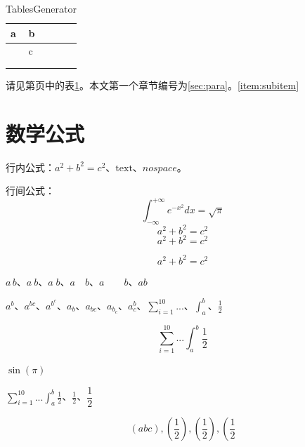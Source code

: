 \documentclass{article}
\begin{document}
\begin{table}
\caption{TablesGenerator}\label{tab:table}
\begin{tabular}{|lllll}
\hline
\multicolumn{1}{|l|}{a} & \multicolumn{1}{l|}{b} & \multicolumn{1}{l|}{} & \multicolumn{1}{l|}{} & \multicolumn{1}{l|}{} \\ \hline
\multicolumn{1}{|l|}{}  & \multicolumn{2}{l|}{c}                         & \multicolumn{1}{l|}{} & \multicolumn{1}{l|}{} \\ \hline
\multicolumn{1}{|l|}{}  & \multicolumn{1}{l|}{}  &                       &                       &                       \\ \hline
                        & \multicolumn{1}{l|}{}  & \multicolumn{1}{l|}{} & \multicolumn{1}{l|}{} & \multicolumn{1}{l|}{} \\ \hline
\end{tabular}
\end{table}

请见第\pageref{tab:table}页中的表\ref{tab:table}。本文第一个章节编号为\ref{sec:para}。\ref{item:subitem}

\appendix

\newpage

\section{数学公式}

行内公式：$a^2+b^2=c^2$、$\text{text}$、$no space$。

行间公式：
\begin{equation}
    \int_{-\infty}^{+\infty} e^{-x^2} dx = \sqrt{\pi}
\end{equation}
$$
a^2+b^2=c^2
$$
\[a^2+b^2=c^2\]

\begin{displaymath}
    a^2+b^2=c^2
\end{displaymath}

$a\,b$、$a\:b$、$a\;b$、$a\quad b$、$a\qquad b$、$a\!b$

$a^b$、$a^{bc}$、$a^{b^c}$、$a_b$、$a_{bc}$、$a_{b_c}$、$a^b_c$、$\sum_{i=1}^{10}...$、$\int_a^b$、$\frac{1}{2}$

$$\sum_{i=1}^{10}...\int_a^b\frac{1}{2}$$

$\sin(\pi)$

$\displaystyle\sum_{i=1}^{10}...\int_a^b\frac{1}{2}$、$\displaystyle\frac{1}{2}$、$\dfrac12$

$$
(abc), (\frac{1}{2}), \left(\frac{1}{2}\right), \left(\frac{1}{2}\right.
$$
\end{document}
